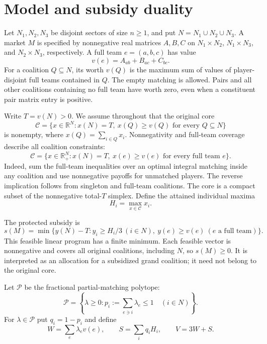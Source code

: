 \documentclass[11pt]{article}
\theoremstyle{remark}
\newcommand{\R}{\mathbb R}
\newcommand{\core}{\mathcal C}
\newcommand{\pack}{\mathcal P}
\begin{document}
\section{Model and subsidy duality}\label{sec:model}
Let $N_1,N_2,N_3$ be disjoint sectors of size $n\ge1$, and put
$N=N_1\cup N_2\cup N_3$. A market $M$ is specified by nonnegative real
matrices $A,B,C$ on $N_1\times N_2$, $N_1\times N_3$, and
$N_2\times N_3$, respectively. A full team $e=(a,b,c)$ has value
\begin{equation}\label{eq:team}
                  v(e)=A_{ab}+B_{ac}+C_{bc}.
\end{equation}
For a coalition $Q\subseteq N$, its worth $v(Q)$ is the maximum sum of
values of player-disjoint full teams contained in $Q$. The empty matching
is allowed. Pairs and all other coalitions containing no full team have
worth zero, even when a constituent pair matrix entry is positive.

Write $T=v(N)>0$. We assume throughout that the original core
\[
 \core=\{x\in\R^N:x(N)=T,\ x(Q)\ge v(Q)\text{ for every }Q\subseteq N\}
\]
is nonempty, where $x(Q)=\sum_{i\in Q}x_i$.
Nonnegativity and full-team coverage describe all coalition constraints:
\begin{equation}\label{eq:core}
 \core=\{x\in\R_+^N:x(N)=T,\ x(e)\ge v(e)\text{ for every full team }e\}.
\end{equation}
Indeed, sum the full-team inequalities over an optimal integral matching
inside any coalition and use nonnegative payoffs for unmatched players.
The reverse implication follows from singleton and full-team coalitions.
The core is a compact subset of the nonnegative total-$T$ simplex. Define
the attained individual maxima
\begin{equation}\label{eq:ideals}
                        H_i=\max_{x\in\core}x_i.
\end{equation}

The protected subsidy is
\begin{equation}\label{eq:subsidy}
 s(M)=\min\{y(N)-T:y_i\ge H_i/3\ (i\in N),\
                         y(e)\ge v(e)\ (e\text{ a full team})\}.
\end{equation}
This feasible linear program has a finite minimum. Each feasible vector
is nonnegative and covers all original coalitions, including $N$, so
$s(M)\ge0$. It is interpreted as an allocation for a subsidized grand
coalition; it need not belong to the original core.

Let $\pack$ be the fractional partial-matching polytope:
\[
 \pack=\left\{\lambda\ge0:
               p_i:=\sum_{e\ni i}\lambda_e\le1\quad(i\in N)\right\}.
\]
For $\lambda\in\pack$ put $q_i=1-p_i$ and define
\begin{equation}\label{eq:dualquantities}
 W=\sum_e\lambda_e v(e),\qquad
 S=\sum_iq_iH_i,\qquad V=3W+S.
\end{equation}
\end{document}
